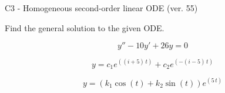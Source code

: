 \begin{exercise}
  \begin{exerciseTitle}C3 - Homogeneous second-order linear ODE (ver. 55)\end{exerciseTitle}
  \begin{exerciseStatement}
    
Find the general solution to the given ODE.

    
\[y''-10y'+26y = 0\]

  \end{exerciseStatement}
  \begin{exerciseAnswer}
    
\[y= c_{1} e^{\left(\left(i + 5\right) \, t\right)} + c_{2} e^{\left(-\left(i - 5\right) \, t\right)}\]

    
\[y= {\left(k_{1} \cos\left(t\right) + k_{2} \sin\left(t\right)\right)} e^{\left(5 \, t\right)}\]

  \end{exerciseAnswer}
\end{exercise}
